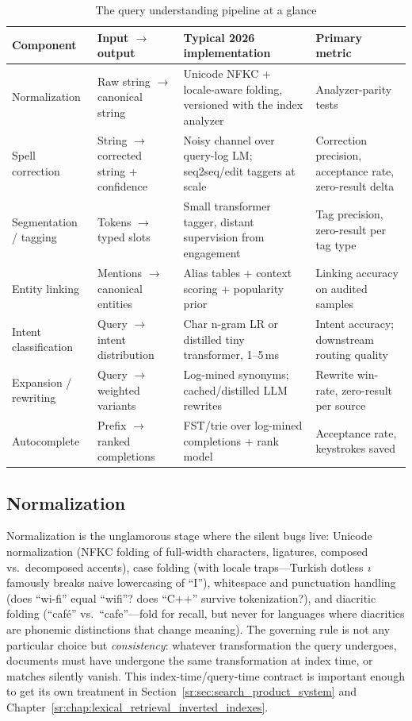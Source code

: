 \begin{table}[H]
\centering
\small
\caption{The query understanding pipeline at a glance}
\label{sr:tab:qu_components}
\begin{tabularx}{\textwidth}{lXXX}
\toprule
\textbf{Component} & \textbf{Input $\to$ output} & \textbf{Typical 2026 implementation} & \textbf{Primary metric} \\
\midrule
Normalization & Raw string $\to$ canonical string & Unicode NFKC + locale-aware folding, versioned with the index analyzer & Analyzer-parity tests \\
Spell correction & String $\to$ corrected string + confidence & Noisy channel over query-log LM; seq2seq/edit taggers at scale & Correction precision, acceptance rate, zero-result delta \\
Segmentation / tagging & Tokens $\to$ typed slots & Small transformer tagger, distant supervision from engagement & Tag precision, zero-result per tag type \\
Entity linking & Mentions $\to$ canonical entities & Alias tables + context scoring + popularity prior & Linking accuracy on audited samples \\
Intent classification & Query $\to$ intent distribution & Char n-gram LR or distilled tiny transformer, 1--5\,ms & Intent accuracy; downstream routing quality \\
Expansion / rewriting & Query $\to$ weighted variants & Log-mined synonyms; cached/distilled LLM rewrites & Rewrite win-rate, zero-result per source \\
Autocomplete & Prefix $\to$ ranked completions & FST/trie over log-mined completions + rank model & Acceptance rate, keystrokes saved \\
\bottomrule
\end{tabularx}
\end{table}

\subsection{Normalization}
\label{sr:sec:query_normalization}

Normalization is the unglamorous stage where the silent bugs live: Unicode normalization (NFKC folding of full-width characters, ligatures, composed vs.\ decomposed accents), case folding (with locale traps---Turkish dotless \textit{\i} famously breaks naive lowercasing of ``I''), whitespace and punctuation handling (does ``wi-fi'' equal ``wifi''? does ``C++'' survive tokenization?), and diacritic folding (``café'' vs.\ ``cafe''---fold for recall, but never for languages where diacritics are phonemic distinctions that change meaning). The governing rule is not any particular choice but \textit{consistency}: whatever transformation the query undergoes, documents must have undergone the same transformation at index time, or matches silently vanish. This index-time/query-time contract is important enough to get its own treatment in Section~\ref{sr:sec:search_product_system} and Chapter~\ref{sr:chap:lexical_retrieval_inverted_indexes}.

